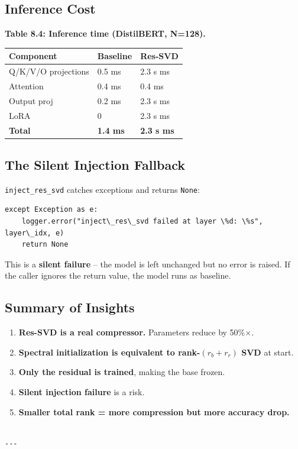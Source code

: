 \subsection{Inference Cost}

\textbf{Table 8.4: Inference time (DistilBERT, N=128).}

\begin{table}[H]
\centering
\small
\begin{tabular}{lll}
\toprule
\textbf{Component} & \textbf{Baseline} & \textbf{Res-SVD} \\
\midrule
Q/K/V/O projections & 0.5 ms & 2.3 s ms \\
Attention & 0.4 ms & 0.4 ms \\
Output proj & 0.2 ms & 2.3 s ms \\
LoRA & 0 & 2.3 s ms \\
\textbf{Total} & \textbf{1.4 ms} & \textbf{2.3 s ms} \\
\bottomrule
\end{tabular}
\end{table}

\subsection{The Silent Injection Fallback}

\texttt{inject\_res\_svd} catches exceptions and returns \texttt{None}:

\begin{lstlisting}
except Exception as e:
    logger.error("inject\_res\_svd failed at layer \%d: \%s", layer\_idx, e)
    return None
\end{lstlisting}

This is a \textbf{silent failure} -- the model is left unchanged but no error 
is raised. If the caller ignores the return value, the model runs as 
baseline.

\subsection{Summary of Insights}

\begin{enumerate}
\item \textbf{Res-SVD is a real compressor.} Parameters reduce by 50\%$\times$.
\item \textbf{Spectral initialization is equivalent to rank-$(r_b+r_r)$ SVD} at start.
\item \textbf{Only the residual is trained}, making the base frozen.
\item \textbf{Silent injection failure} is a risk.
\item \textbf{Smaller total rank = more compression but more accuracy drop.}
\end{enumerate}
\begin{lstlisting}

---
\end{lstlisting}